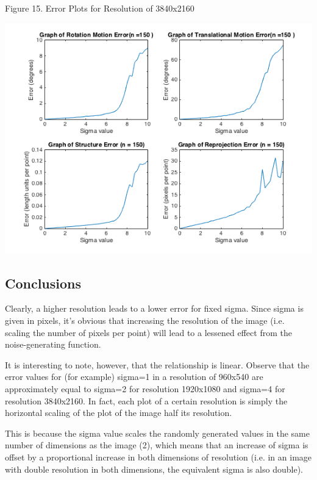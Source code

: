 \documentclass{article}
\begin{document}
\begin{center}
	\begin{center}Figure 15. Error Plots for Resolution of 3840x2160\end{center}
	\includegraphics[width=.7\textwidth,keepaspectratio]{3840x2160_error_plots.png}


\end{center}

\subsection{Conclusions}


Clearly, a higher resolution leads to a lower error for fixed sigma. Since sigma is given in pixels, it's obvious that increasing the resolution of the image (i.e. scaling the number of pixels per point) will lead to a lessened effect from the noise-generating function.



It is interesting to note, however, that the relationship is linear. Observe that the error values for (for example) sigma=1 in a resolution of 960x540 are approximately equal to sigma=2 for resolution 1920x1080 and sigma=4 for resolution 3840x2160. In fact, each plot of a certain resolution is simply the horizontal scaling of the plot of the image half its resolution. 


This is because the sigma value scales the randomly generated values in the same number of dimensions as the image (2), which means that an increase of sigma is offset by a proportional increase in both dimensions of resolution (i.e. in an image with double resolution in both dimensions, the equivalent sigma is also double).
\end{document}
